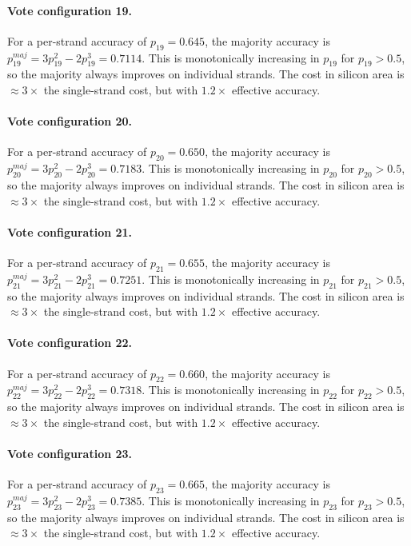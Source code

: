 \paragraph{Vote configuration 19.}
For a per-strand accuracy of $p_{19} = 0.645$, the majority
accuracy is $p_{19}^{maj} = 3p_{19}^2 - 2p_{19}^3 = 0.7114$.
This is monotonically increasing in $p_{19}$ for $p_{19} > 0.5$, so the
majority always improves on individual strands. The cost in silicon area is
$\approx 3\times$ the single-strand cost, but with $1.2\times$ effective accuracy.

\paragraph{Vote configuration 20.}
For a per-strand accuracy of $p_{20} = 0.650$, the majority
accuracy is $p_{20}^{maj} = 3p_{20}^2 - 2p_{20}^3 = 0.7183$.
This is monotonically increasing in $p_{20}$ for $p_{20} > 0.5$, so the
majority always improves on individual strands. The cost in silicon area is
$\approx 3\times$ the single-strand cost, but with $1.2\times$ effective accuracy.

\paragraph{Vote configuration 21.}
For a per-strand accuracy of $p_{21} = 0.655$, the majority
accuracy is $p_{21}^{maj} = 3p_{21}^2 - 2p_{21}^3 = 0.7251$.
This is monotonically increasing in $p_{21}$ for $p_{21} > 0.5$, so the
majority always improves on individual strands. The cost in silicon area is
$\approx 3\times$ the single-strand cost, but with $1.2\times$ effective accuracy.

\paragraph{Vote configuration 22.}
For a per-strand accuracy of $p_{22} = 0.660$, the majority
accuracy is $p_{22}^{maj} = 3p_{22}^2 - 2p_{22}^3 = 0.7318$.
This is monotonically increasing in $p_{22}$ for $p_{22} > 0.5$, so the
majority always improves on individual strands. The cost in silicon area is
$\approx 3\times$ the single-strand cost, but with $1.2\times$ effective accuracy.

\paragraph{Vote configuration 23.}
For a per-strand accuracy of $p_{23} = 0.665$, the majority
accuracy is $p_{23}^{maj} = 3p_{23}^2 - 2p_{23}^3 = 0.7385$.
This is monotonically increasing in $p_{23}$ for $p_{23} > 0.5$, so the
majority always improves on individual strands. The cost in silicon area is
$\approx 3\times$ the single-strand cost, but with $1.2\times$ effective accuracy.

